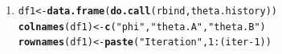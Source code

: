 \documentclass[11pt, a4paper]{article}\usepackage[]{graphicx}\usepackage[]{xcolor}
\makeatletter
\newcommand{\hlnum}[1]{\textcolor[rgb]{0.686,0.059,0.569}{#1}}%
\newcommand{\hlsng}[1]{\textcolor[rgb]{0.192,0.494,0.8}{#1}}%
\newcommand{\hlopt}[1]{\textcolor[rgb]{0,0,0}{#1}}%
\newcommand{\hldef}[1]{\textcolor[rgb]{0.345,0.345,0.345}{#1}}%
\newcommand{\hlkwb}[1]{\textcolor[rgb]{0.69,0.353,0.396}{#1}}%
\newcommand{\hlkwd}[1]{\textcolor[rgb]{0.737,0.353,0.396}{\textbf{#1}}}%
\newenvironment{kframe}{%
 \def\at@end@of@kframe{}%
 \ifinner\ifhmode%
  \def\at@end@of@kframe{\end{minipage}}%
  \begin{minipage}{\columnwidth}%
 \fi\fi%
 \def\FrameCommand##1{\hskip\@totalleftmargin \hskip-\fboxsep
 \colorbox{shadecolor}{##1}\hskip-\fboxsep
     \hskip-\linewidth \hskip-\@totalleftmargin \hskip\columnwidth}%
 \MakeFramed {\advance\hsize-\width
   \@totalleftmargin\z@ \linewidth\hsize
   \@setminipage}}%
 {\par\unskip\endMakeFramed%
 \at@end@of@kframe}
\newenvironment{knitrout}{}{} %
\makeatother
\begin{document}
\begin{enumerate}
\item[\scalebox{2.0}{\twemoji{keycap: 3}}]

\begin{knitrout}
\color{fgcolor}\begin{kframe}
\begin{alltt}
\hldef{df1} \hlkwb{<-} \hlkwd{data.frame}\hldef{(}\hlkwd{do.call}\hldef{(rbind, theta.history))}
\hlkwd{colnames}\hldef{(df1)} \hlkwb{<-} \hlkwd{c}\hldef{(}\hlsng{"phi"}\hldef{,} \hlsng{"theta.A"}\hldef{,} \hlsng{"theta.B"}\hldef{)}
\hlkwd{rownames}\hldef{(df1)} \hlkwb{<-} \hlkwd{paste}\hldef{(}\hlsng{"Iteration "}\hldef{,} \hlnum{1}\hlopt{:}\hldef{(iter}\hlopt{-}\hlnum{1}\hldef{))}
\end{alltt}
\end{kframe}
\end{knitrout}





\end{enumerate}
\end{document}
